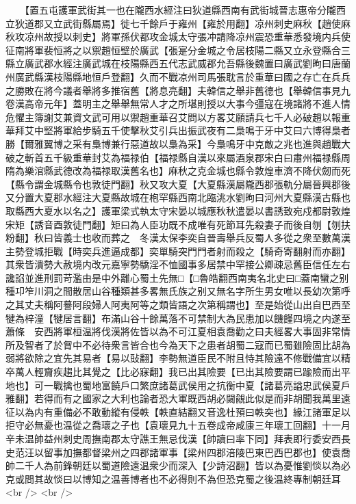 　　【置五屯護軍武街其一也在隴西水經注曰狄道縣西南有武街城晉志惠帝分隴西立狄道郡又立武街縣屬焉】徙七千餘戶于雍州【雍於用翻】凉州刺史麻秋【趙使麻秋攻凉州故授以刺史】將軍孫伏都攻金城太守張冲請降凉州震恐重華悉發境内兵使征南將軍裴恒將之以禦趙恒壁於廣武【張寔分金城之令居枝陽二縣又立永登縣合三縣立廣武郡水經注廣武城在枝陽縣西五代志武威郡允吾縣後魏置曰廣武劉昫曰唐蘭州廣武縣漢枝陽縣地恒戶登翻】久而不戰凉州司馬張耽言於重華曰國之存亡在兵兵之勝敗在將今議者舉將多推宿舊【將息亮翻】夫韓信之舉非舊德也【舉韓信事見九卷漢高帝元年】蓋明主之舉舉無常人才之所堪則授以大事今彊寇在境諸將不進人情危懼主簿謝艾兼資文武可用以禦趙重華召艾問以方畧艾願請兵七千人必破趙以報重華拜艾中堅將軍給步騎五千使擊秋艾引兵出振武夜有二梟鳴于牙中艾曰六博得梟者勝【爾雅翼博之采有梟博兼行惡道故以梟為采】今梟鳴牙中克敵之兆也進與趙戰大破之斬首五千級重華封艾為福禄伯【福禄縣自漢以來屬酒泉郡宋白曰肅州福禄縣周隋為樂涫縣武德改為福禄取漢舊名也】麻秋之克金城也縣令敦煌車濟不降伏劒而死【縣令謂金城縣令也敦徒門翻】秋又攻大夏【大夏縣漢屬隴西郡張軌分屬晉興郡後又分置大夏郡水經注大夏縣故城在枹罕縣西南北臨洮水劉昫曰河州大夏縣漢古縣也取縣西大夏水以名之】護軍梁式執太守宋晏以城應秋秋遣晏以書誘致宛戍都尉敦煌宋矩【誘音酉敦徒門翻】矩曰為人臣功既不成唯有死節耳先殺妻子而後自刎【刎扶粉翻】秋曰皆義士也收而葬之　冬漢太保李奕自晉壽舉兵反蜀人多從之衆至數萬漢主勢登城拒戰【時奕兵進逼成都】奕單騎突門門者射而殺之【騎奇寄翻射而亦翻】其衆皆潰勢大赦境内改元嘉寧勢驕淫不恤國事多居禁中罕接公卿疎忌舊臣信任左右讒諂並進刑罰苛濫由是中外離心蜀土先無□【□魯皓翻西南夷名北史曰□蓋南蠻之别種卭笮川洞之間散居山谷種類甚多畧無氏族之别又無名字所生男女唯以長幼次第呼之其丈夫稱阿謩阿段婦人阿夷阿等之類皆語之次第稱謂也】至是始從山出自巴西至犍為梓潼【犍居言翻】布滿山谷十餘萬落不可禁制大為民患加以饑饉四境之内遂至蕭條　安西將軍桓温將伐漢將佐皆以為不可江夏相袁喬勸之曰夫經畧大事固非常情所及智者了於胷中不必待衆言皆合也今為天下之患者胡蜀二寇而已蜀雖險固比胡為弱將欲除之宜先其易者【易以䜴翻】李勢無道臣民不附且恃其險遠不修戰備宜以精卒萬人輕齎疾趨比其覺之【比必寐翻】我已出其險要【已出其險要謂已踰險而出平地也】可一戰擒也蜀地富饒戶口繁庶諸葛武侯用之抗衡中夏【諸葛亮謚忠武侯夏戶雅翻】若得而有之國家之大利也論者恐大軍既西胡必闚覦此似是而非胡聞我萬里遠征以為内有重備必不敢動縱有侵軼【軼直結翻又音逸杜預曰軼突也】緣江諸軍足以拒守必無憂也温從之喬瓌之子也【袁瓌見九十五卷成帝咸康三年瓌工回翻】十一月辛未温帥益州刺史周撫南郡太守譙王無忌伐漢【帥讀曰率下同】拜表即行委安西長史范汪以留事加撫都督梁州之四郡諸軍事【梁州四郡涪陵巴東巴西巴郡也】使袁喬帥二千人為前鋒朝廷以蜀道險遠温衆少而深入【少詩沼翻】皆以為憂惟劉惔以為必克或問其故惔曰以博知之温善博者也不必得則不為但恐克蜀之後温終專制朝廷耳<br />
<br />
